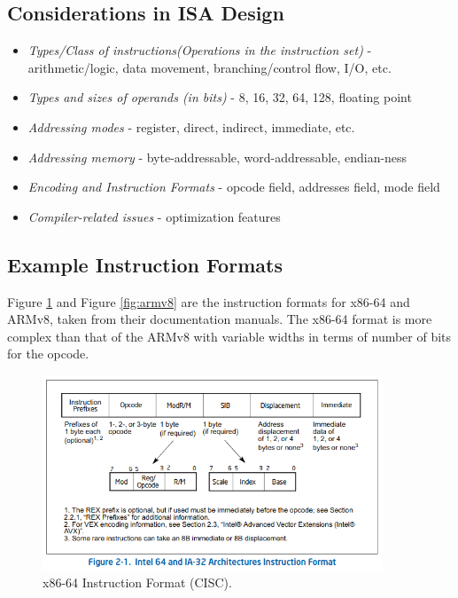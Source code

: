 \documentclass[a4paper, 11pt,oneside]{article}
\begin{document}
\subsection{Considerations in ISA Design}
\begin{itemize}
\item \textit{Types/Class of instructions(Operations in the instruction set)} - 
arithmetic/logic, data movement, branching/control flow, I/O, etc.
\item \textit{Types and sizes of operands (in bits)} - 8, 16, 32, 64, 128, 
floating point 
\item \textit{Addressing modes} - register, direct, indirect, immediate, etc.
\item \textit{Addressing memory} - byte-addressable, word-addressable, 
endian-ness
\item \textit{Encoding and Instruction Formats} - opcode field, addresses 
field, mode 
field
\item \textit{Compiler-related issues} - optimization features
\end{itemize}

\subsection{Example Instruction Formats}
Figure \ref{fig:x86-64} and Figure \ref{fig:armv8}  are the instruction formats 
for x86-64 and ARMv8, taken from their documentation manuals. The x86-64 format 
is more complex than that of the ARMv8 with variable widths in terms of number 
of bits for the opcode.

\begin{figure}[H]
	\begin{center}
	\includegraphics[width=4in]{x86-64.png}
	\caption{x86-64 Instruction Format (CISC).}
	\label{fig:x86-64} 
	\end{center}
\end{figure}
\end{document}
